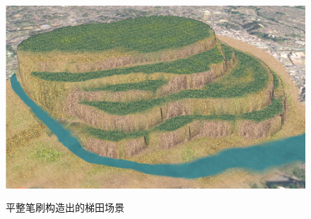 \begin{figure}[h]
    \centering
    \includegraphics[height=7.5cm ,width=11.5cm]{figures/titian.PNG}
  \caption{平整笔刷构造出的梯田场景}
\end{figure}

